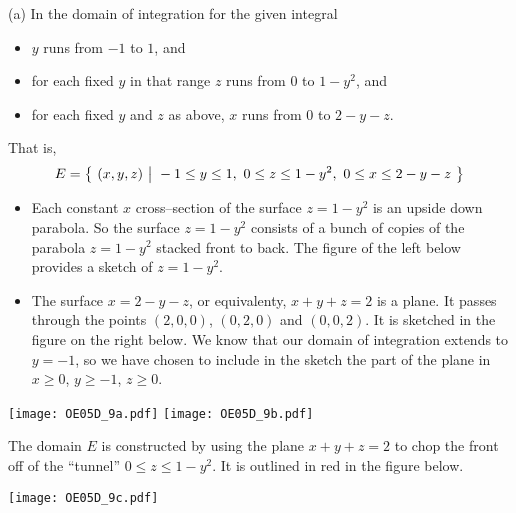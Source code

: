 \begin{solution}
(a) In the domain of integration for the given integral
\begin{itemize}
\item
$y$ runs from $-1$ to $1$, and
\item
for each fixed $y$ in that range $z$ runs from $0$ to $1-y^2$, and
\item
for each fixed $y$ and $z$ as above, $x$ runs from $0$ to $2-y-z$.
\end{itemize}
That is,
\begin{equation*}
E = \big\{ \ (x,y,z)\ \big|\ -1\le y\le 1,\ 0\le z\le 1-y^2,\ 0\le x\le 2-y-z\ \big\}
\end{equation*}
\begin{itemize}
\item
Each constant $x$ cross--section of the surface $z=1-y^2$ is an upside
down parabola. So the surface $z=1-y^2$ consists of a bunch of copies of the
parabola $z=1-y^2$ stacked front to back. The figure of the left below
provides a sketch of $z=1-y^2$.

\item
The surface $x = 2-y-z$, or equivalenty, $x+y+z=2$ is a plane.
It passes through the points  $(2,0,0)$, $(0,2,0)$ and $(0,0,2)$.
It is sketched in the figure on the right below. We know that our
domain of integration extends to $y=-1$, so we have chosen to include
in the sketch the part of the plane in $x\ge 0$, $y\ge-1$, $z\ge 0$.

\end{itemize}
\begin{center}
     \texttt{[image: OE05D\_9a.pdf]}\quad
     \texttt{[image: OE05D\_9b.pdf]}
\end{center}
The domain $E$ is constructed by using the plane $x+y+z=2$
to chop the front off of the ``tunnel'' $0\le z\le 1-y^2$.
It is outlined in red in the figure below.

\begin{center}
     \texttt{[image: OE05D\_9c.pdf]}
\end{center}


\end{solution}
